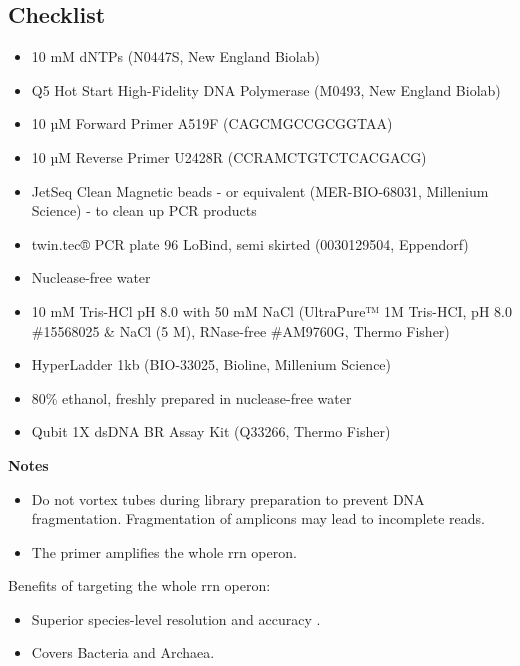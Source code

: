 \documentclass[
]{book}
\providecommand{\tightlist}{%
  \setlength{\itemsep}{0pt}\setlength{\parskip}{0pt}}
\begin{document}
\subsection{Checklist}\label{checklist-1}

\begin{itemize}
\tightlist
\item
  10 mM dNTPs (N0447S, New England Biolab)
\item
  Q5 Hot Start High-Fidelity DNA Polymerase (M0493, New England Biolab)
\item
  10 µM Forward Primer A519F (CAGCMGCCGCGGTAA) \citep{Martijn2019}
\item
  10 µM Reverse Primer U2428R (CCRAMCTGTCTCACGACG) \citep{Martijn2019}
\item
  JetSeq Clean Magnetic beads - or equivalent (MER-BIO-68031, Millenium Science) - to clean up PCR products
\item
  twin.tec® PCR plate 96 LoBind, semi skirted (0030129504, Eppendorf)
\item
  Nuclease-free water
\item
  10 mM Tris-HCl pH 8.0 with 50 mM NaCl (UltraPure™ 1M Tris-HCI, pH 8.0 \#15568025 \& NaCl (5 M), RNase-free \#AM9760G, Thermo Fisher)
\item
  HyperLadder 1kb (BIO-33025, Bioline, Millenium Science)
\item
  80\% ethanol, freshly prepared in nuclease-free water
\item
  Qubit 1X dsDNA BR Assay Kit (Q33266, Thermo Fisher)
\end{itemize}

\textbf{Notes}

\begin{itemize}
\tightlist
\item
  Do not vortex tubes during library preparation to prevent DNA fragmentation. Fragmentation of amplicons may lead to incomplete reads.
\item
  The primer amplifies the whole rrn operon.
\end{itemize}

Benefits of targeting the whole rrn operon:

\begin{itemize}
\tightlist
\item
  Superior species-level resolution and accuracy \citep{Cusco2018, Srinivas2024}.
\item
  Covers Bacteria and Archaea.
\end{itemize}
\end{document}
